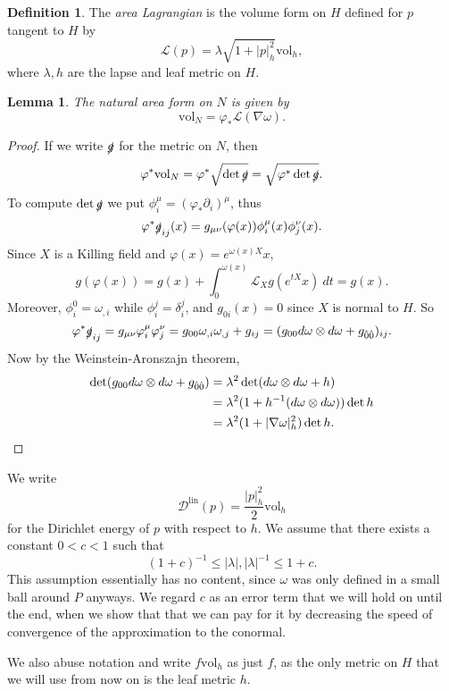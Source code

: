 \documentclass[reqno,12pt,letterpaper]{amsart}
\newcommand{\Lagrange}{\mathscr L}
\newcommand{\DirL}{\mathscr D^{\mathrm{lin}}}
\newcommand{\vol}{\mathrm{vol}}
\newcommand{\dfn}[1]{\emph{#1}\index{#1}}
\newtheorem{lemma}[theorem]{Lemma}
\theoremstyle{definition}
\newtheorem{definition}[theorem]{Definition}
\numberwithin{equation}{section}
\begin{document}
\begin{definition}
The \dfn{area Lagrangian} is the volume form on $H$ defined for $p$ tangent to $H$ by
$$\Lagrange(p) = \lambda \sqrt{1 + |p|_h^2} \vol_h,$$
where $\lambda,h$ are the lapse and leaf metric on $H$.
\end{definition}

\begin{lemma}
The natural area form on $N$ is given by
$$\vol_N = \varphi_* \Lagrange(\nabla \omega).$$
\end{lemma}
\begin{proof}
If we write $\slashed g$ for the metric on $N$, then
$$\varphi^* \vol_N = \varphi^* \sqrt{\det \slashed g} = \sqrt{\varphi^* \det \slashed g}.$$
To compute $\det \slashed g$ we put $\phi_i^\mu = (\varphi_* \partial_i)^\mu$, thus
$$\varphi^* \slashed g_{ij}(x) = g_{\mu\nu}(\varphi(x))\phi^\mu_i(x) \phi^\nu_j(x).$$
Since $X$ is a Killing field and $\varphi(x) = e^{\omega(x)X}x$,
$$g(\varphi(x)) = g(x) + \int_0^{\omega(x)} \mathcal L_X g(e^{tX}x) ~dt = g(x).$$
Moreover, $\phi_i^0 = \omega_{,i}$ while $\phi_i^j = \delta_i^j$, and $g_{0i}(x) = 0$ since $X$ is normal to $H$.
So
$$\varphi^* \slashed g_{ij} = g_{\mu\nu} \varphi_i^\mu \varphi_j^\nu = g_{00} \omega_{,i} \omega_{,j} + g_{ij} = (g_{00}d\omega \otimes d\omega + g_{\hat 0 \hat 0})_{ij}.$$
Now by the Weinstein-Aronszajn theorem,
\begin{align*}
\det(g_{00}d\omega \otimes d\omega + g_{\hat 0 \hat 0})
&= \lambda^2 \det(d\omega \otimes d\omega + h)\\
&= \lambda^2 (1 + h^{-1}(d \omega \otimes d\omega)) \det h \\
&= \lambda^2 (1 + |\nabla \omega|_h^2) \det h. \qedhere
\end{align*}
\end{proof}

We write
$$\DirL(p) = \frac{|p|_h^2}{2}\vol_h$$
for the Dirichlet energy of $p$ with respect to $h$.
We assume that there exists a constant $0 < c < 1$ such that
$$(1 + c)^{-1} \leq |\lambda|, |\lambda|^{-1} \leq 1 + c.$$
This assumption essentially has no content, since $\omega$ was only defined in a small ball around $P$ anyways.
We regard $c$ as an error term that we will hold on until the end, when we show that that we can pay for it by decreasing the speed of convergence of the approximation to the conormal.

We also abuse notation and write $f\vol_h$ as just $f$, as the only metric on $H$ that we will use from now on is the leaf metric $h$.
\end{document}
